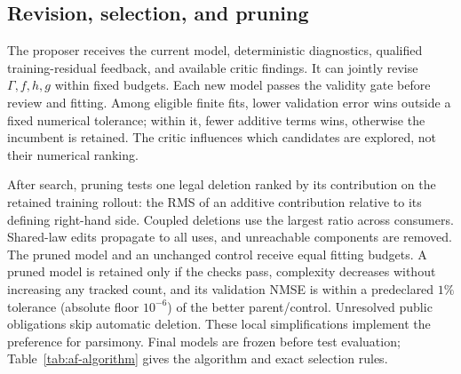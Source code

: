 \subsection{Revision, selection, and pruning}

The proposer receives the current model, deterministic diagnostics,
qualified training-residual feedback, and available critic findings.
It can jointly revise $\Gamma,f,h,g$ within fixed budgets. Each new
model passes the validity gate before review and fitting. Among eligible
finite fits, lower validation error wins outside a fixed numerical
tolerance; within it, fewer additive terms wins, otherwise the incumbent
is retained. The critic influences which candidates are explored,
not their numerical ranking.

After search, pruning tests one legal deletion ranked by its contribution
on the retained training rollout: the RMS of an additive contribution
relative to its defining right-hand side. Coupled deletions use the
largest ratio across consumers. Shared-law edits propagate to all uses,
and unreachable components are removed. The pruned model and an
unchanged control receive equal fitting budgets. A pruned model is
retained only if the checks pass, complexity decreases without increasing
any tracked count, and its validation NMSE is within a predeclared
$1\%$ tolerance (absolute floor $10^{-6}$) of the better parent/control.
Unresolved public obligations skip automatic deletion. These local
simplifications implement the preference for parsimony. Final models
are frozen before test evaluation; Table~\ref{tab:af-algorithm} gives
the algorithm and exact selection rules.
